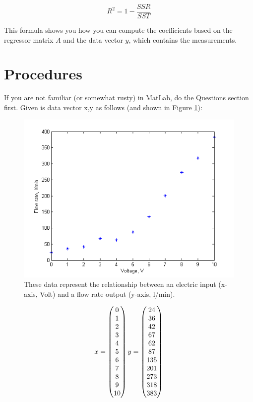 \documentclass[11pt,letterpaper]{article}
\begin{document}
\begin{equation} \label{Eqn:OLS15}
R^2 = 1 -  \dfrac{SSR}{SST}
\end{equation}

This formula shows you how you can compute the coefficients based on the regressor matrix $A$ and the data vector $y$, which contains the measurements.

\section{Procedures}

If you are not familiar (or somewhat rusty) in MatLab, do the Questions section first. Given is data vector x,y as follows (and shown in Figure \ref{fig:Lab6_OLS_Data}):

\begin{figure}
\centering
\includegraphics[width=0.8\linewidth]{Lab6_OLS_Data}
\caption{These data represent the relationship between an electric input (x-axis, Volt) and a flow rate output (y-axis, l/min).}
\label{fig:Lab6_OLS_Data}
\end{figure}

\begin{equation}\label{Eqn:OLS6}
x = 
\begin{pmatrix}
0 \\
1 \\
2 \\
3 \\
4 \\
5 \\
6 \\
7 \\
8 \\
9 \\
10\\
\end{pmatrix}
\\
y=
\begin{pmatrix}
24 \\
36 \\
42 \\
67 \\
62 \\
87 \\
135 \\
201 \\
273 \\
318 \\
383\\
\end{pmatrix}
\end{equation}
\end{document}
